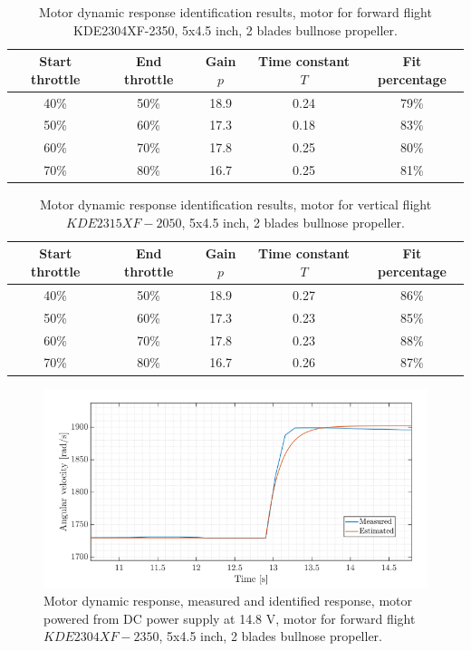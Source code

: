 \begin{table}[h]
    \centering
    \begin{tabular}{ccccc}
    \hline
    Start throttle & End throttle & Gain \( p \) & Time constant \( T \) & Fit percentage \\
    \hline
    40\% & 50\% & 18.9 & 0.24 & 79\% \\
    50\% & 60\% & 17.3 & 0.18 & 83\% \\
    60\% & 70\% & 17.8 & 0.25 & 80\% \\
    70\% & 80\% & 16.7 & 0.25 & 81\% \\
    \hline
    \end{tabular}
    \caption{Motor dynamic response identification results, motor for forward flight KDE2304XF-2350, 5x4.5 inch, 2 blades bullnose propeller.}
    \label{tab:Motor dynamic response1}
\end{table}

\begin{table}[h]
    \centering
    \begin{tabular}{ccccc}
    \hline
    Start throttle & End throttle & Gain \( p \) & Time constant \( T \) & Fit percentage \\
    \hline
    40\% & 50\% & 18.9 & 0.27 & 86\% \\
    50\% & 60\% & 17.3 & 0.23 & 85\% \\
    60\% & 70\% & 17.8 & 0.23 & 88\% \\
    70\% & 80\% & 16.7 & 0.26 & 87\% \\
    \hline
    \end{tabular}
    \caption{Motor dynamic response identification results, motor for vertical flight $KDE2315XF-2050$, 5x4.5 inch, 2 blades bullnose propeller.}
    \label{tab:Motor dynamic response2}
\end{table}

\begin{figure}
    \centering
    \includegraphics[width=0.75\linewidth]{Images/Motor dynamic response.png}
    \caption{Motor dynamic response, measured and identified response, motor powered from DC power supply at 14.8 V, motor for forward flight $KDE2304XF-2350$, 5x4.5 inch, 2 blades bullnose propeller.}
    \label{fig:Motor dynamic response}
\end{figure}

